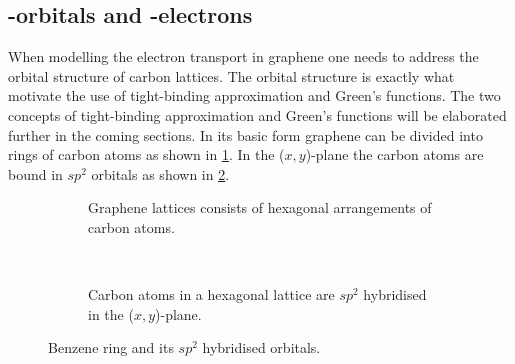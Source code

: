 \subsection{\mathinhead{\pi}{\pi}-orbitals and \mathinhead{\pi}{\pi}-electrons}
When modelling the electron transport in graphene one needs to address the orbital structure of carbon lattices. The orbital structure is exactly what motivate the use of tight-binding approximation and Green's functions. The two concepts of tight-binding approximation and Green's functions will be elaborated further in the coming sections.
In its basic form graphene can be divided into rings of carbon atoms as shown in \cref{ring}. In the (\(x,y\))-plane the carbon atoms are bound in \(sp^2\) orbitals as shown in \cref{sp2}.
\begin{figure}[ht]
	\centering
	\begin{subfigure}[b]{0.3\textwidth}
		\caption{Graphene lattices consists of hexagonal arrangements of carbon atoms.}\label{ring}
	\end{subfigure}
	~
	\begin{subfigure}[b]{0.3\textwidth}
		\centering
		\caption{Carbon atoms in a hexagonal lattice are \(sp^2\) hybridised in the (\(x,y\))-plane.}\label{sp2}
	\end{subfigure}
	\caption{Benzene ring and its \(sp^2\) hybridised orbitals.}\label{Benz}
\end{figure}
